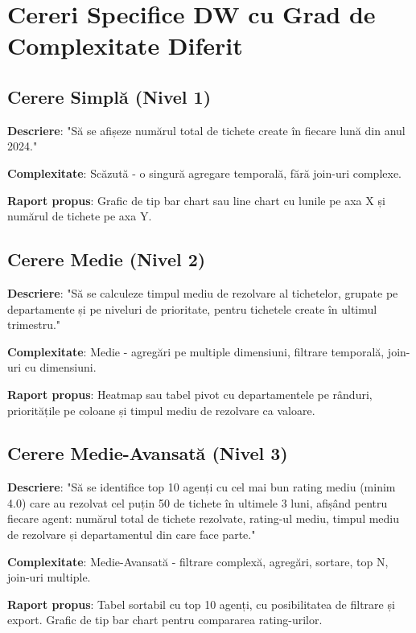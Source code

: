 \chapter{Cereri Specifice DW cu Grad de Complexitate Diferit}
\label{sec:cereri_dw}

\section{Cerere Simplă (Nivel 1)}

\textbf{Descriere}: "Să se afișeze numărul total de tichete create în fiecare lună din anul 2024."

\textbf{Complexitate}: Scăzută - o singură agregare temporală, fără join-uri complexe.

\textbf{Raport propus}: Grafic de tip bar chart sau line chart cu lunile pe axa X și numărul de tichete pe axa Y.

\section{Cerere Medie (Nivel 2)}

\textbf{Descriere}: "Să se calculeze timpul mediu de rezolvare al tichetelor, grupate pe departamente și pe niveluri de prioritate, pentru tichetele create în ultimul trimestru."

\textbf{Complexitate}: Medie - agregări pe multiple dimensiuni, filtrare temporală, join-uri cu dimensiuni.

\textbf{Raport propus}: Heatmap sau tabel pivot cu departamentele pe rânduri, prioritățile pe coloane și timpul mediu de rezolvare ca valoare.

\section{Cerere Medie-Avansată (Nivel 3)}

\textbf{Descriere}: "Să se identifice top 10 agenți cu cel mai bun rating mediu (minim 4.0) care au rezolvat cel puțin 50 de tichete în ultimele 3 luni, afișând pentru fiecare agent: numărul total de tichete rezolvate, rating-ul mediu, timpul mediu de rezolvare și departamentul din care face parte."

\textbf{Complexitate}: Medie-Avansată - filtrare complexă, agregări, sortare, top N, join-uri multiple.

\textbf{Raport propus}: Tabel sortabil cu top 10 agenți, cu posibilitatea de filtrare și export. Grafic de tip bar chart pentru compararea rating-urilor.

